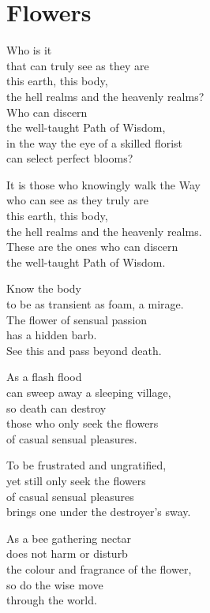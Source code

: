 
\chapter{Flowers}


Who is it\\
that can truly see as they are\\
this earth, this body,\\
the hell realms and the heavenly realms?\\
Who can discern\\
the well-taught Path of Wisdom,\\
in the way the eye of a skilled florist\\
can select perfect blooms?

It is those who knowingly walk the Way\\
who can see as they truly are\\
this earth, this body,\\
the hell realms and the heavenly realms.\\
These are the ones who can discern\\
the well-taught Path of Wisdom.


Know the body\\
to be as transient as foam, a mirage.\\
The flower of sensual passion\\
has a hidden barb.\\
See this and pass beyond death.


As a flash flood\\
can sweep away a sleeping village,\\
so death can destroy\\
those who only seek the flowers\\
of casual sensual pleasures.


To be frustrated and ungratified,\\
yet still only seek the flowers\\
of casual sensual pleasures\\
brings one under the destroyer's sway.


As a bee gathering nectar\\
does not harm or disturb\\
the colour and fragrance of the flower,\\
so do the wise move\\
through the world.


